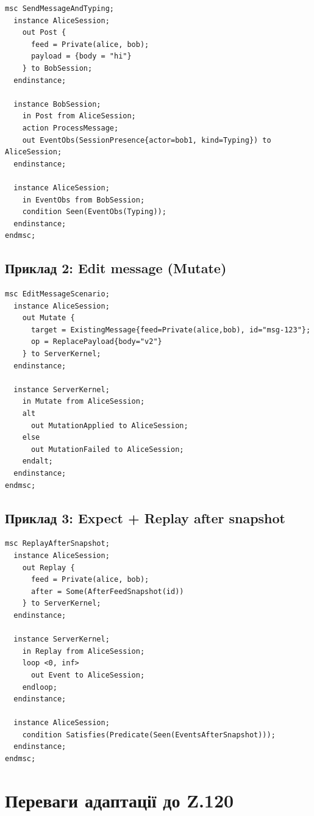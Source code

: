 \documentclass[11pt,a4paper]{article}
\begin{document}
\begin{lstlisting}[language={},basicstyle=\ttfamily\small]
msc SendMessageAndTyping;
  instance AliceSession;
    out Post {
      feed = Private(alice, bob);
      payload = {body = "hi"}
    } to BobSession;
  endinstance;

  instance BobSession;
    in Post from AliceSession;
    action ProcessMessage;
    out EventObs(SessionPresence{actor=bob1, kind=Typing}) to AliceSession;
  endinstance;

  instance AliceSession;
    in EventObs from BobSession;
    condition Seen(EventObs(Typing));
  endinstance;
endmsc;
\end{lstlisting}

\subsection{Приклад 2: Edit message (Mutate)}

\begin{lstlisting}[language={},basicstyle=\ttfamily\small]
msc EditMessageScenario;
  instance AliceSession;
    out Mutate {
      target = ExistingMessage{feed=Private(alice,bob), id="msg-123"};
      op = ReplacePayload{body="v2"}
    } to ServerKernel;
  endinstance;

  instance ServerKernel;
    in Mutate from AliceSession;
    alt
      out MutationApplied to AliceSession;
    else
      out MutationFailed to AliceSession;
    endalt;
  endinstance;
endmsc;
\end{lstlisting}

\subsection{Приклад 3: Expect + Replay after snapshot}

\begin{lstlisting}[language={},basicstyle=\ttfamily\small]
msc ReplayAfterSnapshot;
  instance AliceSession;
    out Replay {
      feed = Private(alice, bob);
      after = Some(AfterFeedSnapshot(id))
    } to ServerKernel;
  endinstance;

  instance ServerKernel;
    in Replay from AliceSession;
    loop <0, inf>
      out Event to AliceSession;
    endloop;
  endinstance;

  instance AliceSession;
    condition Satisfies(Predicate(Seen(EventsAfterSnapshot)));
  endinstance;
endmsc;
\end{lstlisting}

\section{Переваги адаптації до Z.120}
\end{document}
